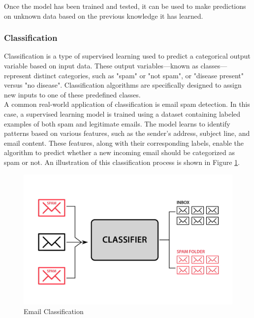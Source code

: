 \newpage

Once the model has been trained and tested, it can be used to make predictions on unknown data based on the previous knowledge it has learned. \cite{google:supervised-learning}

\subsubsection*{Classification}
\label{subsubsec:classification}

Classification is a type of supervised learning used to predict a categorical output variable based on input data. These output variables—known as classes—represent distinct categories, such as "spam" or "not spam", or "disease present" versus "no disease". Classification algorithms are specifically designed to assign new inputs to one of these predefined classes. \cite{google:supervised-learning} \\

A common real-world application of classification is email spam detection. In this case, a supervised learning model is trained using a dataset containing labeled examples of both spam and legitimate emails. The model learns to identify patterns based on various features, such as the sender's address, subject line, and email content. These features, along with their corresponding labels, enable the algorithm to predict whether a new incoming email should be categorized as spam or not. An illustration of this classification process is shown in Figure \ref{fig:classification}. \cite{google:supervised-learning}

\begin{figure}[h!]
    \centering
    \includegraphics[width=0.75\linewidth]{figures/theory/classification.jpg}
    \caption[Email Classification]{Email Classification \cite{analytixlabs:classification}}
    \label{fig:classification}
\end{figure}

